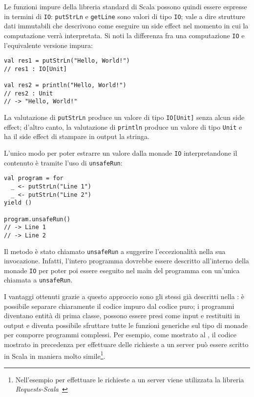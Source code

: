 Le funzioni impure della libreria standard di Scala possono quindi essere espresse in termini di \lstinline{IO}:
\lstinline{putStrLn} e \lstinline{getLine} sono valori di tipo \lstinline{IO}; vale a dire strutture dati immutabili che descrivono come eseguire un side effect nel momento in cui la computazione verrà interpretata. Si noti la differenza fra una computazione \lstinline{IO} e l'equivalente versione impura:
\begin{lstlisting}[language=scala3]
val res1 = putStrLn("Hello, World!")
// res1 : IO[Unit]

val res2 = println("Hello, World!")
// res2 : Unit
// -> "Hello, World!"
\end{lstlisting}
La valutazione di \lstinline{putStrLn} produce un valore di tipo \lstinline{IO[Unit]} senza alcun side effect; d'altro canto, la valutazione di \lstinline{println} produce un valore di tipo \lstinline{Unit} e ha il side effect di stampare in output la stringa.

L'unico modo per poter estrarre un valore dalla monade \lstinline{IO} interpretandone il contenuto è tramite l'uso di \lstinline{unsafeRun}:
\begin{lstlisting}[language=scala3]
val program = for
  _ <- putStrLn("Line 1")
  _ <- putStrLn("Line 2")
yield ()

program.unsafeRun()
// -> Line 1
// -> Line 2
\end{lstlisting}
Il metodo è stato chiamato \lstinline{unsafeRun} a suggerire l'eccezionalità nella sua invocazione. Infatti, l'intero programma dovrebbe essere descritto all'interno della monade \lstinline{IO} per poter poi essere eseguito nel main del programma con un'unica chiamata a \lstinline{unsafeRun}.

I vantaggi ottenuti grazie a questo approccio sono gli stessi già descritti nella : è possibile separare chiaramente il codice impuro dal codice puro; i programmi diventano entità di prima classe, possono essere presi come input e restituiti in output e diventa possibile sfruttare tutte le funzioni generiche sul tipo di monade per comporre programmi complessi. Per esempio, come mostrato al , il codice mostrato in precedenza per effettuare delle richieste a un server può essere scritto in Scala in maniera molto simile\footnote{Nell'esempio per effettuare le richieste a un server viene utilizzata la libreria \emph{Requests-Scala}~\cite{cit:requests-scala}}.

